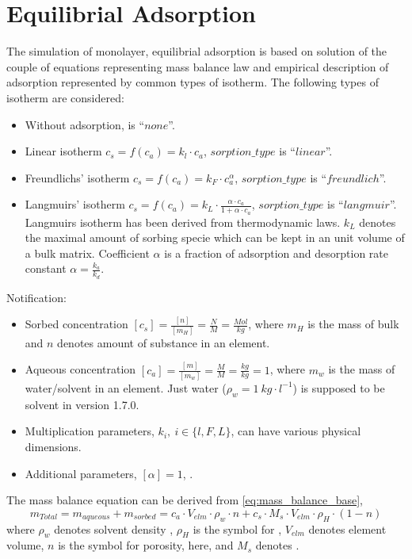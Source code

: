 \section{Equilibrial Adsorption}\label{sec:sorp_math}
The simulation of monolayer, equilibrial adsorption is based on solution of the couple of equations representing mass balance law and empirical description of adsorption represented by common types of isotherm. The following types of isotherm are considered:
\begin{itemize}
 \item Without adsorption,  is ``$none$''.
 \item Linear isotherm $c_s = f(c_a) = k_l\cdot c_a$, $sorption\_type$ is ``$linear$''.
 \item Freundlichs' isotherm $c_s = f(c_a) = k_F\cdot c_a^{\alpha}$, $sorption\_type$ is ``$freundlich$''.
 \item Langmuirs' isotherm $c_s = f(c_a) = k_L\cdot \frac{\alpha\cdot c_a}{1 + \alpha\cdot c_a}$, $sorption\_type$ is ``$langmuir$''. Langmuirs isotherm has been derived from thermodynamic laws. $k_L$ denotes the maximal amount of sorbing specie which can be kept in an unit volume of a bulk matrix. Coefficient $\alpha$ is a fraction of adsorption and desorption rate constant $\alpha = \frac{k_a}{k_d}$.
\end{itemize}
Notification:
\begin{itemize}
 \item Sorbed concentration $[c_s] = \frac{[n]}{[m_H]} = \frac{N}{M} = \frac{Mol}{kg}$, where $m_H$ is the mass of bulk and $n$ denotes amount of substance in an element.
 \item Aqueous concentration $[c_a] = \frac{[m]}{[m_w]} = \frac{M}{M} = \frac{kg}{kg} = 1$, where $m_w$ is the mass of water/solvent in an element. Just water ($\rho_w = 1~kg\cdot l^{-1}$) is supposed to be solvent in version 1.7.0. 
 \item Multiplication parameters, $k_i, ~i\in\{ l,F,L\}$,  can have various physical dimensions.
 \item Additional parameters, $[\alpha] = 1$, .
\end{itemize}
The mass balance equation can be derived from \ref{eq:mass_balance_base},
\begin{equation}
  m_{Total} = m_{aqueous} + m_{sorbed} = c_a\cdot V_{elm}\cdot\rho_w\cdot n + c_s\cdot M_s \cdot V_{elm}\cdot\rho_H\cdot(1-n)
  \label{eq:mass_balance_base}
\end{equation}
where $\rho_w$ denotes solvent density , $\rho_H$ is the symbol for , $V_{elm}$ denotes element volume, $n$ is the symbol for porosity, here, and $M_s$ denotes .

